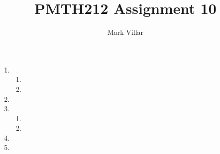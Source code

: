\documentclass[12pt]{amsart}
\title{PMTH212 Assignment 10}
\author{Mark Villar}
\begin{document}
 

\maketitle 

\begin{enumerate}
	
	\item
	
		\begin{enumerate}
		
			\item
			
			\item
		
		\end{enumerate}
					
	\item
		
	\item 
		
		\begin{enumerate}
		
			\item
			
			\item
		
		\end{enumerate}
							
	\item 
			
	\item
				
\end{enumerate}
\end{document}
